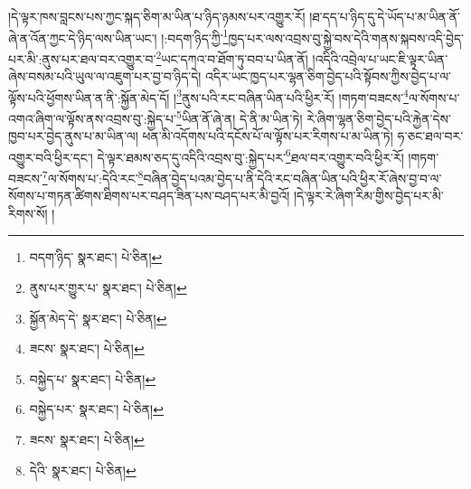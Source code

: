 །དེ་ལྟར་ཁས་བླངས་པས་ཀྱང་སྐད་ཅིག་མ་ཡིན་པ་ཉིད་ཉམས་པར་འགྱུར་རོ། །ཐ་དད་པ་ཉིད་དུ་དེ་ཡོད་པ་མ་ཡིན་ནོ་ཞེ་ན་འོན་ཀྱང་དེ་ཉིད་ལས་ཡིན་ཡང་། །:བདག་ཉིད་ཀྱི་\footnote{བདག་ཉིད་  སྣར་ཐང་།  པེ་ཅིན། }ཁྱད་པར་ལས་འབྲས་བུ་སྐྱེ་བས་དེའི་གནས་སྐབས་འདི་བྱེད་པར་མི་:ནུས་པར་ཐལ་བར་འགྱུར་བ་\footnote{ནུས་པར་གྱུར་པ་  སྣར་ཐང་།  པེ་ཅིན། }ཡང་དཀའ་བ་ཐོག་ཏུ་བབ་པ་ཡིན་ནོ། །འདིའི་འབྲེལ་པ་ཡང་ཇི་ལྟར་ཡིན་ཞེས་བསམ་པའི་ཡུལ་ལ་འཇུག་པར་བྱ་བ་ཉིད་དེ། འདིར་ཡང་ཁྱད་པར་ལྷན་ཅིག་བྱེད་པའི་སྟོབས་ཀྱིས་བྱེད་པ་ལ་ལྟོས་པའི་ཕྱོགས་ཡིན་ན་ནི་:སྐྱོན་མེད་དོ། །\footnote{སྐྱོན་མེད་དེ་  སྣར་ཐང་།  པེ་ཅིན། }ནུས་པའི་རང་བཞིན་ཡིན་པའི་ཕྱིར་རོ། །གཏག་བཟངས་\footnote{ཟངས་  སྣར་ཐང་།  པེ་ཅིན། }ལ་སོགས་པ་འགའ་ཞིག་ལ་ལྟོས་ནས་འབྲས་བུ་:སྐྱེད་པ་\footnote{བསྐྱེད་པ་  སྣར་ཐང་།  པེ་ཅིན། }ཡིན་ནོ་ཞེ་ན། དེ་ནི་མ་ཡིན་ཏེ། རེ་ཞིག་ལྷན་ཅིག་བྱེད་པའི་རྐྱེན་དེས་ཁྱབ་པར་བྱེད་ནུས་པ་མ་ཡིན་ལ། ཕན་མི་འདོགས་པའི་དངོས་པོ་ལ་ལྟོས་པར་རིགས་པ་མ་ཡིན་ཏེ། ཧ་ཅང་ཐལ་བར་འགྱུར་བའི་ཕྱིར་དང་། དེ་ལྟར་ཐམས་ཅད་དུ་འདིའི་འབྲས་བུ་:སྐྱེད་པར་\footnote{བསྐྱེད་པར་  སྣར་ཐང་།  པེ་ཅིན། }ཐལ་བར་འགྱུར་བའི་ཕྱིར་རོ། །གཏག་བཟངས་\footnote{ཟངས་  སྣར་ཐང་།  པེ་ཅིན། }ལ་སོགས་པ་:དེའི་རང་\footnote{དེའི་  སྣར་ཐང་།  པེ་ཅིན། }བཞིན་བྱེད་པའམ་བྱེད་པ་ནི་དེའི་རང་བཞིན་ཡིན་པའི་ཕྱིར་རོ་ཞེས་བྱ་བ་ལ་སོགས་པ་གཏན་ཚིགས་ཐིགས་པར་བཤད་ཟིན་པས་བཤད་པར་མི་བྱའོ། །དེ་ལྟར་རེ་ཞིག་རིམ་གྱིས་བྱེད་པར་མི་རིགས་སོ། །
